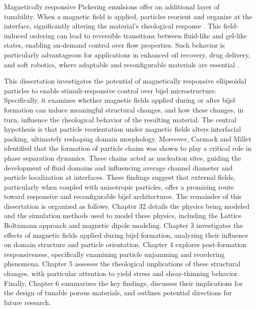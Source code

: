 Magnetically responsive Pickering emulsions offer an additional layer of tunability. When a magnetic field is applied, particles reorient and organize at the interface, significantly altering the material's 
rheological response \cite{qiao_magnetorheological_2012, melle_pickering_2005}. This field-induced ordering can lead to reversible transitions between fluid-like and gel-like states, enabling on-demand control 
over flow properties. Such behavior is particularly advantageous for applications in enhanced oil recovery, drug delivery, and soft robotics, where adaptable and reconfigurable materials are essential 
\cite{tham_magnetophoresis_2021}.

This dissertation investigates the potential of magnetically responsive ellipsoidal particles to enable stimuli-responsive control over bijel microstructure. Specifically, it examines whether magnetic fields 
applied during or after bijel formation can induce meaningful structural changes, and how these changes, in turn, influence the rheological behavior of the resulting material. The central hypothesis is that 
particle reorientation under magnetic fields alters interfacial packing, ultimately reshaping domain morphology. 
Moreover, Carmack and Millet identified that the formation of particle chains was shown to play a critical role in phase separation dynamics. These chains acted as nucleation sites, guiding the development of 
fluid domains and influencing average channel diameter and particle localization at interfaces. These findings suggest that external fields, particularly when coupled with anisotropic particles, offer a 
promising route toward responsive and reconfigurable bijel architectures.
The remainder of this dissertation is organized as follows. Chapter 32 details the physics being modeled and the simulation methods used to model these physics, including the Lattice Boltzmann approach 
and magnetic dipole modeling. Chapter 3 investigates the effects of magnetic fields applied during bijel formation, analyzing their influence on domain structure and particle orientation. Chapter 4 explores 
post-formation responsiveness, specifically examining particle unjamming and reordering phenomena. Chapter 5 assesses the rheological implications of these structural changes, with particular attention to 
yield stress and shear-thinning behavior. Finally, Chapter 6 summarizes the key findings, discusses their implications for the design of tunable porous materials, and outlines potential directions for future 
research.




